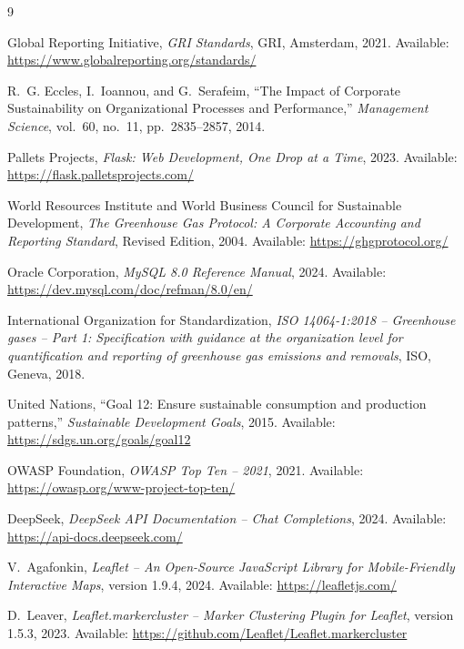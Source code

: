 \documentclass[11pt,a4paper]{article}
\begin{document}
\begin{thebibliography}{9}

Global Reporting Initiative,
\textit{GRI Standards},
GRI, Amsterdam, 2021.
Available: \url{https://www.globalreporting.org/standards/}

R.~G. Eccles, I.~Ioannou, and G.~Serafeim,
``The Impact of Corporate Sustainability on Organizational Processes and Performance,''
\textit{Management Science}, vol.~60, no.~11, pp.~2835--2857, 2014.

Pallets Projects,
\textit{Flask: Web Development, One Drop at a Time},
2023.
Available: \url{https://flask.palletsprojects.com/}

World Resources Institute and World Business Council for Sustainable Development,
\textit{The Greenhouse Gas Protocol: A Corporate Accounting and Reporting Standard},
Revised Edition, 2004.
Available: \url{https://ghgprotocol.org/}

Oracle Corporation,
\textit{MySQL 8.0 Reference Manual},
2024.
Available: \url{https://dev.mysql.com/doc/refman/8.0/en/}

International Organization for Standardization,
\textit{ISO 14064-1:2018 -- Greenhouse gases -- Part 1: Specification with guidance at the organization level for quantification and reporting of greenhouse gas emissions and removals},
ISO, Geneva, 2018.

United Nations,
``Goal 12: Ensure sustainable consumption and production patterns,''
\textit{Sustainable Development Goals},
2015.
Available: \url{https://sdgs.un.org/goals/goal12}

OWASP Foundation,
\textit{OWASP Top Ten -- 2021},
2021.
Available: \url{https://owasp.org/www-project-top-ten/}

DeepSeek,
\textit{DeepSeek API Documentation -- Chat Completions},
2024.
Available: \url{https://api-docs.deepseek.com/}

V.~Agafonkin,
\textit{Leaflet -- An Open-Source JavaScript Library for Mobile-Friendly Interactive Maps}, version 1.9.4,
2024.
Available: \url{https://leafletjs.com/}

D.~Leaver,
\textit{Leaflet.markercluster -- Marker Clustering Plugin for Leaflet}, version 1.5.3,
2023.
Available: \url{https://github.com/Leaflet/Leaflet.markercluster}


\end{thebibliography}
\end{document}
